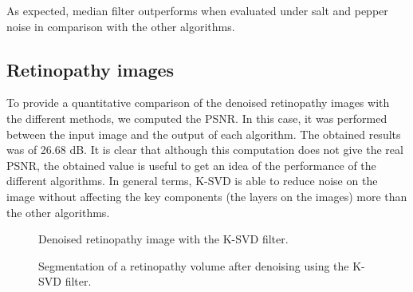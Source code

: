 As expected, median filter outperforms when evaluated under salt and pepper noise in comparison with the other algorithms. 


\subsection{Retinopathy images} 
To provide a quantitative comparison of the denoised retinopathy images with the different methods, we computed the PSNR. In this case, it was performed between the input image and the output of each algorithm. The obtained results was of 26.68 dB. It is clear that although this computation does not give the real PSNR, the obtained value is useful to get an idea of the performance of the different algorithms. In general terms, K-SVD is able to reduce noise on the image without affecting the key components (the layers on the images) more than the other algorithms.

\begin{figure}[H]
  \centering
  \caption{Denoised retinopathy image with the K-SVD filter.} 
  \label{fig:results_rimage_ksvd}
\end{figure}

\begin{figure}[H]
  \centering
  \caption{Segmentation of a retinopathy volume after denoising using the K-SVD filter.} 
  \label{fig:results_rsegmentation_ksvd}
\end{figure}
